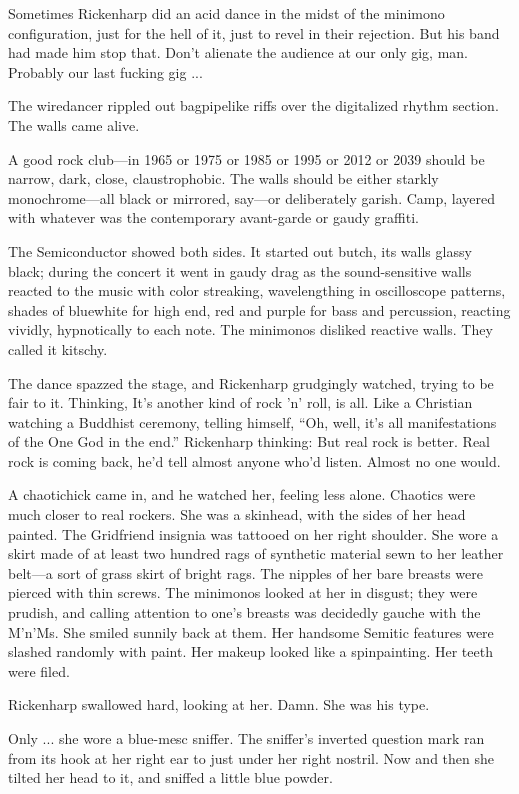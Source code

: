 Sometimes Rickenharp did an acid dance in the midst of the minimono configuration, just for the hell of it, just to revel in their rejection. But his band had made him stop that. Don't alienate the audience at our only gig, man. Probably our last fucking gig ...

The wiredancer rippled out bagpipelike riffs over the digitalized rhythm section. The walls came alive.

A good rock club—in 1965 or 1975 or 1985 or 1995 or 2012 or 2039 should be narrow, dark, close, claustrophobic. The walls should be either starkly monochrome—all black or mirrored, say—or deliberately garish. Camp, layered with whatever was the contemporary avant-garde or gaudy graffiti.

The Semiconductor showed both sides. It started out butch, its walls glassy black; during the concert it went in gaudy drag as the sound-sensitive walls reacted to the music with color streaking, wavelengthing in oscilloscope patterns, shades of bluewhite for high end, red and purple for bass and percussion, reacting vividly, hypnotically to each note. The minimonos disliked reactive walls. They called it kitschy.

The dance spazzed the stage, and Rickenharp grudgingly watched, trying to be fair to it. Thinking, It's another kind of rock 'n' roll, is all. Like a Christian watching a Buddhist ceremony, telling himself, ``Oh, well, it's all manifestations of the One God in the end.'' Rickenharp thinking: But real rock is better. Real rock is coming back, he'd tell almost anyone who'd listen. Almost no one would.

A chaotichick came in, and he watched her, feeling less alone. Chaotics were much closer to real rockers. She was a skinhead, with the sides of her head painted. The Gridfriend insignia was tattooed on her right shoulder. She wore a skirt made of at least two hundred rags of synthetic material sewn to her leather belt—a sort of grass skirt of bright rags. The nipples of her bare breasts were pierced with thin screws. The minimonos looked at her in disgust; they were prudish, and calling attention to one's breasts was decidedly gauche with the M'n'Ms. She smiled sunnily back at them. Her handsome Semitic features were slashed randomly with paint. Her makeup looked like a spinpainting. Her teeth were filed.

Rickenharp swallowed hard, looking at her. Damn. She was his type.

Only ... she wore a blue-mesc sniffer. The sniffer's inverted question mark ran from its hook at her right ear to just under her right nostril. Now and then she tilted her head to it, and sniffed a little blue powder.

